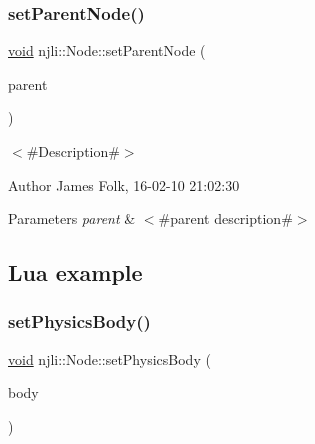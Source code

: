 \begin{DoxyCodeInclude}
\end{DoxyCodeInclude}
\mbox{\label{classnjli_1_1_node_adb9348e3765aacbabc94297e39a0ce16}} 
\subsubsection{\texorpdfstring{set\+Parent\+Node()}{setParentNode()}}
{\footnotesize\ttfamily \mbox{\hyperlink{_thread_8h_af1e856da2e658414cb2456cb6f7ebc66}{void}} njli\+::\+Node\+::set\+Parent\+Node (\begin{DoxyParamCaption}\item[{\mbox{\hyperlink{classnjli_1_1_node}{Node}} $\ast$}]{parent }\end{DoxyParamCaption})}



$<$\#\+Description\#$>$ 

\begin{DoxyAuthor}{Author}
James Folk, 16-\/02-\/10 21\+:02\+:30
\end{DoxyAuthor}

\begin{DoxyParams}{Parameters}
{\em parent} & $<$\#parent description\#$>$\\
\hline
\end{DoxyParams}
\hypertarget{classnjli_1_1_steering_behavior_wander_ex1}{}\subsection{Lua example}\label{classnjli_1_1_steering_behavior_wander_ex1}

\begin{DoxyCodeInclude}
\end{DoxyCodeInclude}
\mbox{\label{classnjli_1_1_node_a53df21090a93628066b4fd351317a36b}} 
\subsubsection{\texorpdfstring{set\+Physics\+Body()}{setPhysicsBody()}}
{\footnotesize\ttfamily \mbox{\hyperlink{_thread_8h_af1e856da2e658414cb2456cb6f7ebc66}{void}} njli\+::\+Node\+::set\+Physics\+Body (\begin{DoxyParamCaption}\item[{\mbox{\hyperlink{classnjli_1_1_physics_body}{Physics\+Body}} $\ast$}]{body }\end{DoxyParamCaption})}



